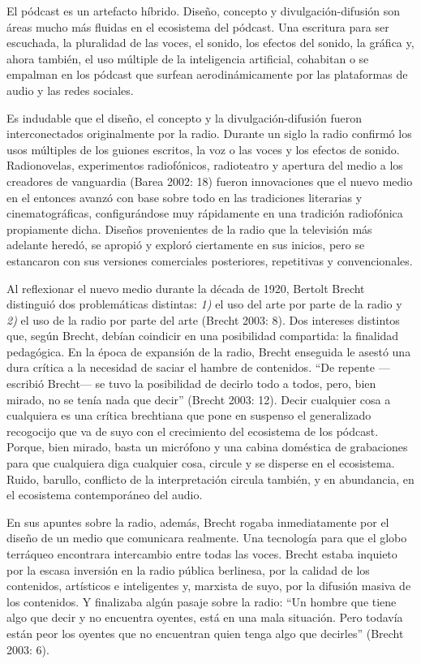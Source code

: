 \documentclass[
]{interact}
\begin{document}
El pódcast es un artefacto híbrido. Diseño, concepto y
divulgación-difusión son áreas mucho más fluidas en el ecosistema del
pódcast. Una escritura para ser escuchada, la pluralidad de las voces,
el sonido, los efectos del sonido, la gráfica y, ahora también, el uso
múltiple de la inteligencia artificial, cohabitan o se empalman en los
pódcast que surfean aerodinámicamente por las plataformas de audio y las
redes sociales.

Es indudable que el diseño, el concepto y la divulgación-difusión fueron
interconectados originalmente por la radio. Durante un siglo la radio
confirmó los usos múltiples de los guiones escritos, la voz o las voces
y los efectos de sonido. Radionovelas, experimentos radiofónicos,
radioteatro y apertura del medio a los creadores de vanguardia (Barea
2002: 18) fueron innovaciones que el nuevo medio en el entonces avanzó
con base sobre todo en las tradiciones literarias y cinematográficas,
configurándose muy rápidamente en una tradición radiofónica propiamente
dicha. Diseños provenientes de la radio que la televisión más adelante
heredó, se apropió y exploró ciertamente en sus inicios, pero se
estancaron con sus versiones comerciales posteriores, repetitivas y
convencionales.

Al reflexionar el nuevo medio durante la década de 1920, Bertolt Brecht
distinguió dos problemáticas distintas: \emph{1)} el uso del arte por
parte de la radio y \emph{2)} el uso de la radio por parte del arte
(Brecht 2003: 8). Dos intereses distintos que, según Brecht, debían
coindicir en una posibilidad compartida: la finalidad pedagógica. En la
época de expansión de la radio, Brecht enseguida le asestó una dura
crítica a la necesidad de saciar el hambre de contenidos. ``De repente
---escribió Brecht--- se tuvo la posibilidad de decirlo todo a todos,
pero, bien mirado, no se tenía nada que decir'' (Brecht 2003: 12). Decir
cualquier cosa a cualquiera es una crítica brechtiana que pone en
suspenso el generalizado recogocijo que va de suyo con el crecimiento
del ecosistema de los pódcast. Porque, bien mirado, basta un micrófono y
una cabina doméstica de grabaciones para que cualquiera diga cualquier
cosa, circule y se disperse en el ecosistema. Ruido, barullo, conflicto
de la interpretación circula también, y en abundancia, en el ecosistema
contemporáneo del audio.

En sus apuntes sobre la radio, además, Brecht rogaba inmediatamente por
el diseño de un medio que comunicara realmente. Una tecnología para que
el globo terráqueo encontrara intercambio entre todas las voces. Brecht
estaba inquieto por la escasa inversión en la radio pública berlinesa,
por la calidad de los contenidos, artísticos e inteligentes y, marxista
de suyo, por la difusión masiva de los contenidos. Y finalizaba algún
pasaje sobre la radio: ``Un hombre que tiene algo que decir y no
encuentra oyentes, está en una mala situación. Pero todavía están peor
los oyentes que no encuentran quien tenga algo que decirles'' (Brecht
2003: 6).
\end{document}
